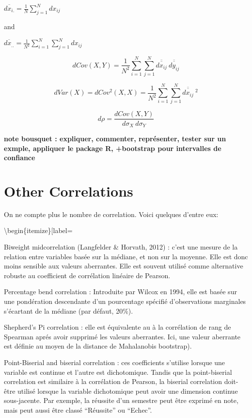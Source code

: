 \documentclass[
]{report}
\begin{document}
\(\overline{dx_{i.}}=\frac{1}{N}\sum_{j=1}^{N} dx_{ij}\)

and

\(\overline{dx_{..}}=\frac{1}{N^2}\sum_{i=1}^{N}\sum_{j=1}^{N} dx_{ij}\)

\[dCov(X,Y)=\frac{1}{N^2}\sum_{i=1}^{N}\sum_{j=1}^{N}
\overline{\overline{dx_{ij}}}~ 
\overline{\overline{dy_{ij}}}\]

\[dVar(X)=dCov^2(X,X)=\frac{1}{N^2}\sum_{i=1}^{N}\sum_{j=1}^{N} 
\overline{\overline{dx_{ij}}}~^2\]

\[d\rho=\frac{dCov(X,Y)}{d\sigma_X~d\sigma_Y}\]

\textbf{note bousquet : expliquer, commenter, représenter, tester sur un exmple, appliquer le package R, +bootstrap pour intervalles de confiance}

\hypertarget{other-correlations}{%
\section{Other Correlations}\label{other-correlations}}

On ne compte plus le nombre de correlation. Voici quelques d'entre eux:

\textbackslash begin\{itemize\}{[}label=\textbullet{]}

\item

Biweight midcorrelation (Langfelder \& Horvath, 2012) : c'est une mesure de la relation entre variables basée sur la médiane, et non sur la moyenne. Elle est donc moins sensible aux valeurs aberrantes. Elle est souvent utilisé comme alternative robuste au coefficient de corrélation linéaire de Pearson.

\item

Percentage bend correlation : Introduite par Wilcox en 1994, elle est basée sur une pondération descendante d'un pourcentage spécifié d'observations marginales s'écartant de la médiane (par défaut, 20\%).

\item

Shepherd's Pi correlation : elle est équivalente au à la corrélation de rang de Spearman aprés avoir supprimé les valeurs aberrantes. Ici, une valeur aberrante est définie au moyen de la distance de Mahalanobis bootstrap).

\item

Point-Biserial and biserial correlation : ces coefficients s'utilise lorsque une variable est continue et l'autre est dichotomique. Tandis que la point-biserial correlation est similaire à la corrélation de Pearson, la biserial correlation doit-être utilisé lorsque la variable dichotomique peut avoir une dimension continue sous-jacente. Par exemple, la réussite d'un semestre peut être exprimé en note, mais peut aussi être classé ``Réussite'' ou ``Echec''.\\
\end{document}

